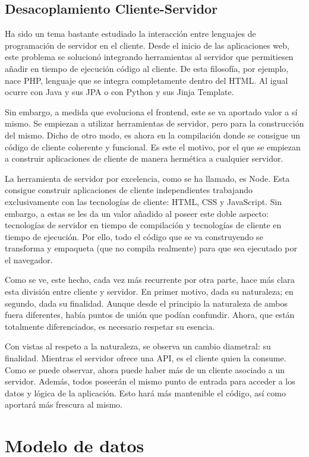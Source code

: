 \subsection{Desacoplamiento Cliente-Servidor}
Ha sido un tema bastante estudiado la interacción entre lenguajes de programación de servidor en el cliente. Desde el inicio de las aplicaciones web, este problema se solucionó integrando herramientas al servidor que permitiesen añadir en tiempo de ejecución código al cliente. De esta filosofía, por ejemplo, nace PHP, lenguaje que se integra completamente dentro del HTML. Al igual ocurre con Java y sus JPA o con Python y sus Jinja Template.

Sin embargo, a medida que evoluciona el frontend, este se va aportado valor a sí mismo. Se empiezan a utilizar herramientas de servidor, pero para la construcción del mismo. Dicho de otro modo, es ahora en la compilación donde se consigue un código de cliente coherente y funcional. Es este el motivo, por el que se empiezan a construir aplicaciones de cliente de manera hermética a cualquier servidor.

La herramienta de servidor por excelencia, como se ha llamado, es Node. Esta consigue construir aplicaciones de cliente independientes trabajando exclusivamente con las tecnologías de cliente: HTML, CSS y JavaScript. Sin embargo, a estas se les da un valor añadido al poseer este doble aspecto: tecnologías de servidor en tiempo de compilación y tecnologías de cliente en tiempo de ejecución. Por ello, todo el código que se va construyendo se transforma y empaqueta (que no compila realmente) para que sea ejecutado por el navegador.

Como se ve, este hecho, cada vez más recurrente por otra parte, hace más clara esta división entre cliente y servidor. En primer motivo, dada su naturaleza; en segundo, dada su finalidad. Aunque desde el principio la naturaleza de ambos fuera diferentes, había puntos de unión que podían confundir. Ahora, que están totalmente diferenciados, es necesario respetar su esencia.

Con vistas al respeto a la naturaleza, se observa un cambio diametral: su finalidad. Mientras el servidor ofrece una API, es el cliente quien la consume. Como se puede observar, ahora puede haber más de un cliente asociado a un servidor. Además, todos poseerán el mismo punto de entrada para acceder a los datos y lógica de la aplicación. Esto hará más mantenible el código, así como aportará más frescura al mismo.

\section{Modelo de datos}\label{sec:modelo_datos}

